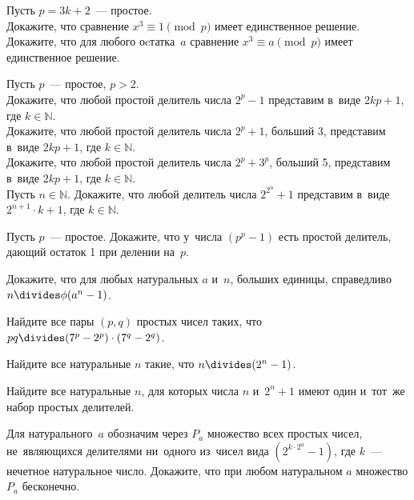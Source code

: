 \begin{problems}

\item
Пусть $p = 3 k + 2$~--- простое.
\\
\subproblem
Докажите, что сравнение $x^3 \equiv 1 \pmod{p}$ имеет единственное решение.
\\
\subproblem
Докажите, что для любого оcтатка~$a$ сравнение $x^3 \equiv a \pmod{p}$ имеет
единственное решение.

\item
Пусть $p$~--- простое, $p > 2$.
\\
\subproblem
Докажите, что любой простой делитель числа $2^p - 1$ представим
в~виде $2 k p + 1$, где $k \in \mathbb{N}$.
\\
\subproblem
Докажите, что любой простой делитель числа $2^p + 1$, больший 3, представим
в~виде $2 k p + 1$, где $k \in \mathbb{N}$.
\\
\subproblem
Докажите, что любой простой делитель числа $2^p + 3^p$, больший 5, представим
в~виде $2 k p + 1$, где $k \in \mathbb{N}$.
\\
\subproblem
Пусть $n \in \mathbb{N}$.
Докажите, что любой делитель числа $2^{2^n} + 1$ представим
в~виде $2^{n+1} \cdot k + 1$, где $k \in \mathbb{N}$.

\item
Пусть $p$~--- простое.
Докажите, что у~числа $(p^p - 1)$ есть простой делитель, дающий остаток 1 при
делении на~$p$.

\item
Докажите, что для любых натуральных $a$ и~$n$, больших единицы, справедливо
$n \divides \eulerphi(a^n - 1)$.

\item
Найдите все пары $(p, q)$ простых чисел таких, что
$p q \divides (7^{p} - 2^{p}) \cdot (7^{q} - 2^{q})$.

\item
Найдите все натуральные $n$ такие, что $n \divides (2^n - 1)$.

\item
Найдите все натуральные $n$, для которых числа $n$ и~$2^n + 1$ имеют один
и~тот~же набор простых делителей. 	

\item
Для натурального~$a$ обозначим через $P_a$ множество всех простых чисел,
не~являющихся делителями ни~одного из~чисел вида $(2^{k \cdot 2^a} - 1)$, где
$k$~--- нечетное натуральное число.
Докажите, что при любом натуральном $a$ множество $P_a$ бесконечно.

\end{problems}

\endgroup %

